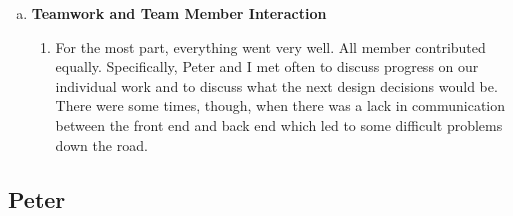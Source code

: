 \documentclass[11pt]{article}   %
\begin{document}
\begin{enumerate} [a)]
\begin{enumerate} [$\cdot$]
\item One constraint we found was that it was very difficult to create a mongoose schema with JSON object as property value. For example, property \texttt{attendees} was composed of an array of JSON objects. For some reason, mongodb / mongoose could not handle the editing of such JSON objects and save them properly. Hence, we had to devise our own way to edit the JSON objects to get around this constraint. The solution: set the property to null, and recreate the JSON object every time rather than try and edit the JSON object individually while still a part of the mongoose document.
\end{enumerate}
\item  {\bf Teamwork and Team Member Interaction}
\begin{enumerate} [$\cdot$]
\item For the most part, everything went very well. All member contributed equally. Specifically, Peter and I met often to discuss progress on our individual work and to discuss what the next design decisions would be. There were some times, though, when there was a lack in communication between the front end and back end which led to some difficult problems down the road.
\end{enumerate}
\end{enumerate}

\subsection*{Peter}
\end{document}

